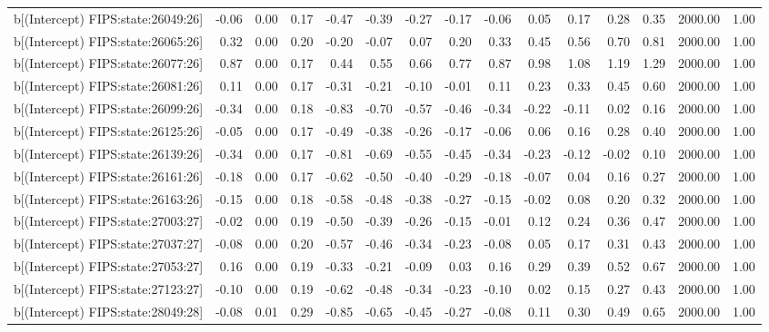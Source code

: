 \begin{table}[ht]
\begin{tabular}{rrrrrrrrrrrrrrr}
  b[(Intercept) FIPS:state:26049:26] & -0.06 & 0.00 & 0.17 & -0.47 & -0.39 & -0.27 & -0.17 & -0.06 & 0.05 & 0.17 & 0.28 & 0.35 & 2000.00 & 1.00 \\ 
  b[(Intercept) FIPS:state:26065:26] & 0.32 & 0.00 & 0.20 & -0.20 & -0.07 & 0.07 & 0.20 & 0.33 & 0.45 & 0.56 & 0.70 & 0.81 & 2000.00 & 1.00 \\ 
  b[(Intercept) FIPS:state:26077:26] & 0.87 & 0.00 & 0.17 & 0.44 & 0.55 & 0.66 & 0.77 & 0.87 & 0.98 & 1.08 & 1.19 & 1.29 & 2000.00 & 1.00 \\ 
  b[(Intercept) FIPS:state:26081:26] & 0.11 & 0.00 & 0.17 & -0.31 & -0.21 & -0.10 & -0.01 & 0.11 & 0.23 & 0.33 & 0.45 & 0.60 & 2000.00 & 1.00 \\ 
  b[(Intercept) FIPS:state:26099:26] & -0.34 & 0.00 & 0.18 & -0.83 & -0.70 & -0.57 & -0.46 & -0.34 & -0.22 & -0.11 & 0.02 & 0.16 & 2000.00 & 1.00 \\ 
  b[(Intercept) FIPS:state:26125:26] & -0.05 & 0.00 & 0.17 & -0.49 & -0.38 & -0.26 & -0.17 & -0.06 & 0.06 & 0.16 & 0.28 & 0.40 & 2000.00 & 1.00 \\ 
  b[(Intercept) FIPS:state:26139:26] & -0.34 & 0.00 & 0.17 & -0.81 & -0.69 & -0.55 & -0.45 & -0.34 & -0.23 & -0.12 & -0.02 & 0.10 & 2000.00 & 1.00 \\ 
  b[(Intercept) FIPS:state:26161:26] & -0.18 & 0.00 & 0.17 & -0.62 & -0.50 & -0.40 & -0.29 & -0.18 & -0.07 & 0.04 & 0.16 & 0.27 & 2000.00 & 1.00 \\ 
  b[(Intercept) FIPS:state:26163:26] & -0.15 & 0.00 & 0.18 & -0.58 & -0.48 & -0.38 & -0.27 & -0.15 & -0.02 & 0.08 & 0.20 & 0.32 & 2000.00 & 1.00 \\ 
  b[(Intercept) FIPS:state:27003:27] & -0.02 & 0.00 & 0.19 & -0.50 & -0.39 & -0.26 & -0.15 & -0.01 & 0.12 & 0.24 & 0.36 & 0.47 & 2000.00 & 1.00 \\ 
  b[(Intercept) FIPS:state:27037:27] & -0.08 & 0.00 & 0.20 & -0.57 & -0.46 & -0.34 & -0.23 & -0.08 & 0.05 & 0.17 & 0.31 & 0.43 & 2000.00 & 1.00 \\ 
  b[(Intercept) FIPS:state:27053:27] & 0.16 & 0.00 & 0.19 & -0.33 & -0.21 & -0.09 & 0.03 & 0.16 & 0.29 & 0.39 & 0.52 & 0.67 & 2000.00 & 1.00 \\ 
  b[(Intercept) FIPS:state:27123:27] & -0.10 & 0.00 & 0.19 & -0.62 & -0.48 & -0.34 & -0.23 & -0.10 & 0.02 & 0.15 & 0.27 & 0.43 & 2000.00 & 1.00 \\ 
  b[(Intercept) FIPS:state:28049:28] & -0.08 & 0.01 & 0.29 & -0.85 & -0.65 & -0.45 & -0.27 & -0.08 & 0.11 & 0.30 & 0.49 & 0.65 & 2000.00 & 1.00 \\ 

\end{tabular}
\end{table}
